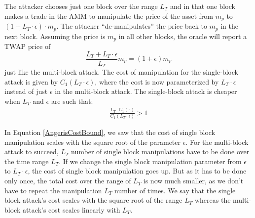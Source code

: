 The attacker chooses just one block over the range $L_T$ and in that one block makes a trade in the AMM to manipulate the price of the asset from $m_p$ to $(1 + L_T \cdot \epsilon) \cdot m_p$. The attacker ``de-manipulates'' the price back to $m_p$ in the next block. Assuming the price is $m_p$ in all other blocks, the oracle will report a TWAP price of $$\frac{ L_{T} + L_T \cdot \epsilon}{L_{T}} m_p = (1+\epsilon) m_p$$ just like the multi-block attack. The cost of manipulation for the single-block attack is given by $C_1(L_T \cdot \epsilon)$, where the cost is now parameterized by $L_T\cdot\epsilon$ instead of just $\epsilon$ in the multi-block attack. The single-block attack is cheaper when $L_T$ and $\epsilon$ are such that:
\begin{align}
   \frac{L_T \cdot C_1 (\epsilon)}{C_1(L_T \cdot \epsilon)} > 1
   \label{OneBlockCheaperEq}
\end{align}

In Equation \ref{AngerisCostBound}, we saw that the cost of single block manipulation scales with the square root of the parameter $\epsilon$. For the multi-block attack to succeed, $L_T$ number of single block manipulations have to be done over the time range $L_T$. If we change the single block manipulation parameter from $\epsilon$ to $L_T\cdot\epsilon$, the cost of single block manipulation goes up. But as it has to be done only once, the total cost over the range of $L_T$ is now much smaller, as we don't have to repeat the manipulation $L_T$ number of times. We say that the single block attack's cost scales with the square root of the range $L_T$ whereas the multi-block attack's cost scales linearly with $L_T$.

